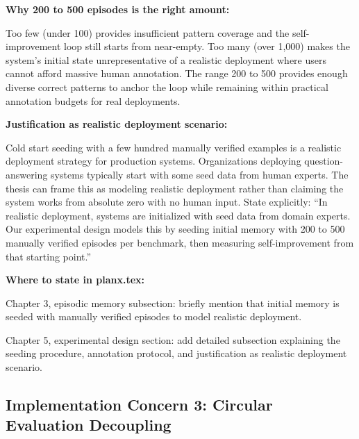 \documentclass[11pt,a4paper]{article}
\begin{document}
{\textbf{Why 200 to 500 episodes is the right amount:}

Too few (under 100) provides insufficient pattern coverage and the self-improvement loop still starts from near-empty. Too many (over 1,000) makes the system's initial state unrepresentative of a realistic deployment where users cannot afford massive human annotation. The range 200 to 500 provides enough diverse correct patterns to anchor the loop while remaining within practical annotation budgets for real deployments.

\textbf{Justification as realistic deployment scenario:}

Cold start seeding with a few hundred manually verified examples is a realistic deployment strategy for production systems. Organizations deploying question-answering systems typically start with some seed data from human experts. The thesis can frame this as modeling realistic deployment rather than claiming the system works from absolute zero with no human input. State explicitly: ``In realistic deployment, systems are initialized with seed data from domain experts. Our experimental design models this by seeding initial memory with 200 to 500 manually verified episodes per benchmark, then measuring self-improvement from that starting point.''

\textbf{Where to state in planx.tex:}

Chapter 3, episodic memory subsection: briefly mention that initial memory is seeded with manually verified episodes to model realistic deployment.

Chapter 5, experimental design section: add detailed subsection explaining the seeding procedure, annotation protocol, and justification as realistic deployment scenario.
}

\subsection{Implementation Concern 3: Circular Evaluation Decoupling}
\end{document}
